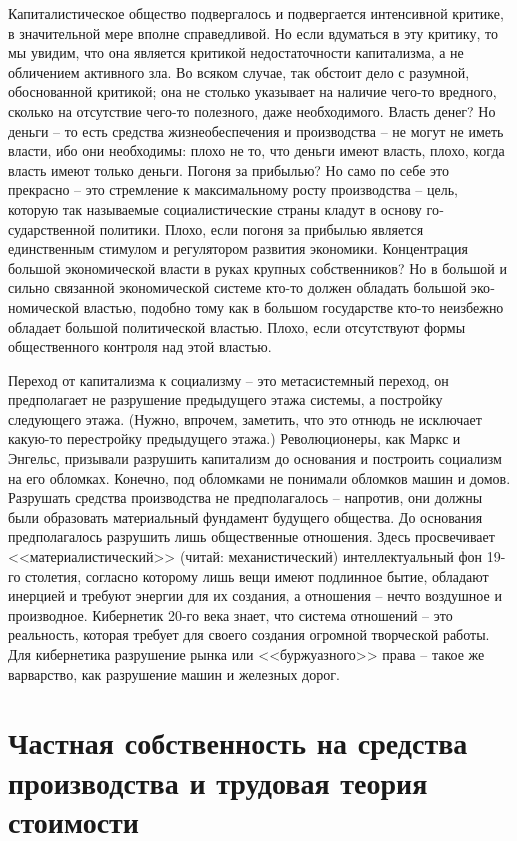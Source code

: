 \documentclass{book}
\begin{document}
Капиталистическое общество подвергалось и подвергается интенсивной критике, в значительной мере вполне справедли­вой. Но если вдуматься в эту критику, то мы увидим, что она является критикой недостаточности капитализма,  а не обличе­нием активного зла. Во всяком случае, так обстоит дело с ра­зумной, обоснованной критикой; она не столько указывает на наличие чего-то вредного, сколько на отсутствие чего-то полезного, даже необходимого. Власть денег? Но деньги -- то есть средства жизнеобеспечения и производства -- не могут не иметь власти, ибо они необходимы: плохо не то, что деньги имеют власть, плохо, когда власть имеют только  деньги. По­гоня за прибылью? Но само по себе это прекрасно -- это стрем­ление к максимальному росту производства -- цель, которую так называемые социалистические страны кладут в основу го­сударственной политики. Плохо, если погоня за прибылью яв­ляется единственным  стимулом и регулятором развития эко­номики. Концентрация большой экономической власти в руках крупных собственников? Но в 
большой и сильно связанной экономической системе кто-то должен обладать большой эко­номической властью, подобно тому как в большом государст­ве кто-то неизбежно обладает большой политической властью. Плохо, если отсутствуют формы общественного контроля  над этой властью.

Переход от капитализма к социализму -- это метасистемный переход, он предполагает не разрушение предыдущего этажа системы, а постройку следующего этажа. (Нужно, впрочем, заметить, что это отнюдь не исключает какую-то перестройку предыдущего этажа.) Революционеры, как Маркс и Энгельс, призывали разрушить капитализм до основания и построить социализм на его обломках. Конечно, под обломками не пони­мали обломков машин и домов. Разрушать средства произ­водства не предполагалось -- напротив, они должны были обра­зовать материальный фундамент будущего общества. До осно­вания  предполагалось разрушить лишь общественные отно­шения. Здесь просвечивает <<материалистический>> (читай: меха­нистический) интеллектуальный фон 19-го столетия, согласно которому лишь вещи имеют подлинное бытие, обладают инер­цией и требуют энергии для их создания, а отношения -- нечто воздушное и производное. Кибернетик 20-го века знает, что система отношений -- это реальность, которая требует для своего создания огромной творческой работы. 
Для 
кибернетика раз­рушение рынка или <<буржуазного>> права -- такое же варварст­во, как разрушение машин и железных дорог.



\section{Частная собственность на средства производства и трудовая теория стоимости}
\end{document}
